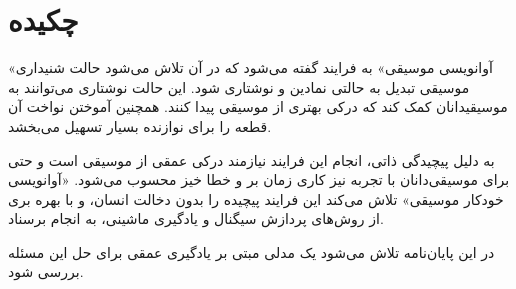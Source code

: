 \chapter*{چکیده}
«آوانویسی موسیقی» به فرایند گفته می‌شود که در آن تلاش می‌شود حالت شنیداری
موسیقی تبدیل به حالتی نمادین و نوشتاری شود. این حالت نوشتاری می‌توانند به
موسیقیدانان کمک کند که درکی بهتری از موسیقی پیدا کنند. همچنین آموختن نواخت آن
قطعه را برای نوازنده بسیار تسهیل می‌بخشد.

به دلیل پیچیدگی ذاتی، انجام این فرایند نیازمند درکی عمقی از موسیقی است و حتی
برای موسیقی‌دانان با تجربه نیز کاری زمان بر و خطا خیز محسوب می‌شود. «آوانویسی
خودکار موسیقی» تلاش می‌کند این فرایند پیچیده را بدون دخالت انسان، و با بهره بری
از روش‌های پردازش سیگنال و یادگیری ماشینی، به انجام برسناد.

در این پایان‌نامه تلاش می‌شود یک مدلی مبتی بر یادگیری عمقی برای حل این مسئله
بررسی شود.